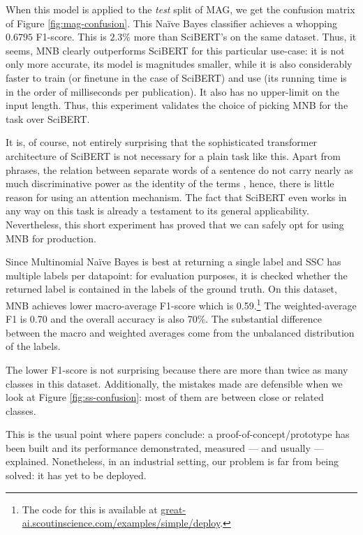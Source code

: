 When this model is applied to the \textit{test} split of MAG, we get the confusion matrix of Figure \ref{fig:mag-confusion}. This Naïve Bayes classifier achieves a whopping $0.6795$ F1-score. This is $2.3\%$ more than SciBERT's on the same dataset. Thus, it seems, MNB clearly outperforms SciBERT for this particular use-case: it is not only more accurate, its model is magnitudes smaller, while it is also considerably faster to train (or finetune in the case of SciBERT) and use (its running time is in the order of milliseconds per publication). It also has no upper-limit on the input length. Thus, this experiment validates the choice of picking MNB for the task over SciBERT.

It is, of course, not entirely surprising that the sophisticated transformer architecture of SciBERT is not necessary for a plain task like this. Apart from phrases, the relation between separate words of a sentence do not carry nearly as much discriminative power as the identity of the terms \cite{hand2001idiot}, hence, there is little reason for using an attention mechanism. The fact that SciBERT even works in any way on this task is already a testament to its general applicability. Nevertheless, this short experiment has proved that we can safely opt for using MNB for production.

Since Multinomial Naïve Bayes is best at returning a single label and SSC has multiple labels per datapoint: for evaluation purposes, it is checked whether the returned label is contained in the labels of the ground truth. On this dataset, MNB achieves lower macro-average F1-score which is 0.59.\footnote{The code for this is available at \href{https://great-ai.scoutinscience.com/examples/simple/deploy}{great-ai.scoutinscience.com/examples/simple/deploy}.} The weighted-average F1 is 0.70 and the overall accuracy is also 70\%. The substantial difference between the macro and weighted averages come from the unbalanced distribution of the labels.

The lower F1-score is not surprising because there are more than twice as many classes in this dataset. Additionally, the mistakes made are defensible when we look at Figure \ref{fig:ss-confusion}: most of them are between close or related classes.

\begin{displayquote}
This is the usual point where papers conclude: a proof-of-concept/prototype has been built and its performance demonstrated, measured --- and usually --- explained. Nonetheless, in an industrial setting, our problem is far from being solved: it has yet to be deployed.
\end{displayquote}

